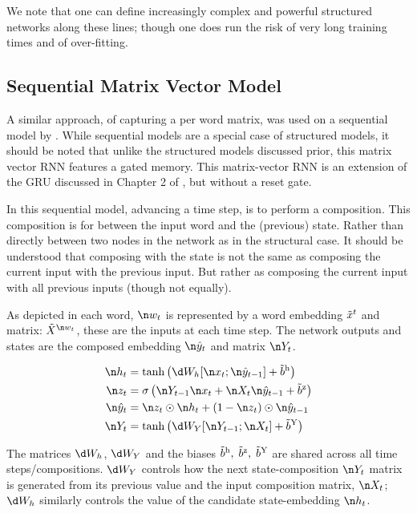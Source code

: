 {We note that one can define increasingly complex and powerful structured networks along these lines; though one does run the risk of very long training times and of over-fitting.

\subsection{Sequential Matrix Vector Model}
A similar approach, of capturing a per word matrix, 
was used on a sequential model by .
While sequential models are a special case of structured models,
it should be noted that unlike the structured models discussed prior,
this matrix vector RNN features a gated memory.
This matrix-vector RNN is an extension of the GRU discussed in  Chapter 2 of , but without a reset gate.


In this sequential model, advancing a time step, is to perform a composition.
This composition is for between the input word and the (previous) state.
Rather than directly between two nodes in the network as in the structural case.
It should be understood that composing with the state is not the same as composing the current input with the previous input.
But rather as composing the current input with all previous inputs (though not equally).

As depicted in  each word, $\n w_t$ is represented by a word embedding $\nv x_{t}$ and matrix: $\nv X_{\n w_t}$, these are the inputs at each time step.
The network outputs and states are the composed embedding $\n \hat{y}_t$ and matrix $\n Y_t$.



\begin{align}
\n h_t &= \tanh\left(\d W_h [\n x_t; \n \hat{y}_{t-1}] + \dv b_h \right)\\
\n z_t &= \sigma\left(\n Y_{t-1} \n x_t + \n X_t \n \hat{y}_{t-1} + \dv b_z \right)\\
%
\n \hat{y}_t &= \n z_t \odot \n h_t + (1 - \n z_t) \odot \n \hat{y}_{t-1} \\
\n Y_t &= \tanh \left( \d W_Y [\n Y_{t-1}; \n X_t] + \dv b_Y \right)
\end{align}



The matrices $\d W_h$, $\d W_Y$ and the biases $\dv b_h,\; \dv b_z,\; \dv b_Y$ are shared across all time steps/compositions.
$\d W_Y$ controls how the next state-composition $\n Y_t$ matrix is generated from its previous value and the input composition matrix, $\n X_t$;
$\d W_h$ similarly controls the value of the candidate state-embedding $\n h_t$.

}
